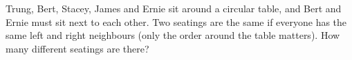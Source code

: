 Trung, Bert, Stacey, James and Ernie sit around a circular table, and Bert and Ernie must sit next to each other. Two seatings are the same if everyone has the same left and right neighbours (only the order around the table matters). How many different seatings are there?
